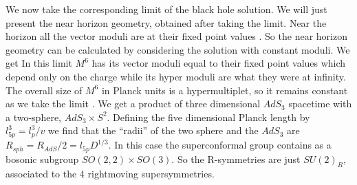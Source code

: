 We now  take the corresponding limit of the black hole solution. 
We will just present the near horizon geometry, obtained after
taking the limit. Near the horizon all the vector 
moduli  are at their fixed point values \fmf . So the near horizon 
geometry can be calculated by considering the solution with
constant moduli. We get 
\eqn{}
In this limit 
 $M^6$ has its  vector moduli equal to their fixed point values
which depend only on the charge
while its  hyper  moduli are  what
they were at infinity.
  The overall size  of $M^6$ in Planck units
is a hypermultiplet, so
it remains constant as we take the limit \limittf .
We get a product of three dimensional $AdS_3$ spacetime  with a two-sphere,
$AdS_3\times S^2$.
Defining the five dimensional Planck length by 
$l_{5p}^3 = l_p^3/v$ we find that 
the ``radii''  of the two sphere and the $AdS_3 $ are
$R_{sph} = R_{AdS}/2 = l_{5p} D^{1/3}$.
%
In this case the superconformal group  contains as  a bosonic
subgroup  $SO(2,2)\times SO(3)$. So the R-symmetries are just $SU(2)_R$,
associated to the 4 rightmoving supersymmetries.


